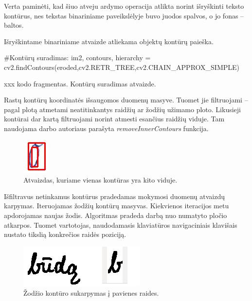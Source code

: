 \documentclass[a4paper,12pt]{article}
\begin{document}
Verta paminėti, kad šiuo atveju ardymo operacija atlikta norint išryškinti teksto kontūrus, nes tekstas binariniame paveikslėlyje buvo juodos spalvos, o jo fonas – baltos.

Išryškintame binariniame atvaizde atliekama objektų kontūrų paieška.
	\begin{listing}[H]
\begin{pythoncode}
#Kontūrų suradimas:
im2, contours, hierarchy = cv2.findContours(eroded,cv2.RETR_TREE,cv2.CHAIN_APPROX_SIMPLE)
\end{pythoncode}
		\begin{center}
			xxx kodo fragmentas. Kontūrų suradimas atvaizde.
		\end{center}		
	\end{listing}
	
Rastų kontūrų koordinatės išsaugomos duomenų masyve. Tuomet jie filtruojami – pagal plotą atmetami neatitinkantys raidžių ar žodžių užimamo ploto. Likusieji kontūrai dar kartą filtruojami norint atmesti esančius raidžių viduje. Tam naudojama darbo autoriaus parašyta \textit{removeInnerContours} funkcija.

		\begin{figure}[H]
			\centering
			\includegraphics[scale=0.5]{images/removecntrs}
			\caption{Atvaizdas, kuriame vienas kontūras yra kito viduje.}   %
			\label{img:removecntrs}
		\end{figure}
		

Išfiltravus netinkamus kontūrus pradedamas mokymosi duomenų atvaizdų karpymas. Iteruojamas žodžių kontūrų masyvas. Kiekvienos iteracijos metu apdorojamas naujas žodis. Algoritmas pradeda darbą nuo numatyto pločio atkarpos. Tuomet vartotojas, naudodamasis klaviatūros navigaciniais klavišais nustato tikslią konkrečios raidės poziciją.

		\begin{figure}[H]
			\centering
			\includegraphics[scale=0.5]{images/selectletter}
			\caption{Žodžio kontūro sukarpymas į pavienes raides.}   %
			\label{img:selectletter}
		\end{figure}
		
\end{document}
